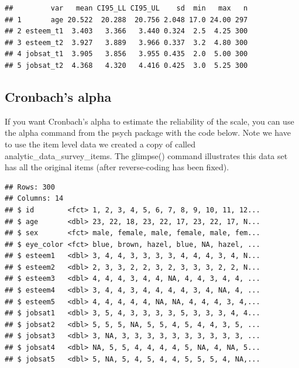 \documentclass[
]{krantz}
\makeatletter
\newenvironment{Shaded}{\begin{snugshade}}{\end{snugshade}}
\newcommand{\KeywordTok}[1]{\textcolor[rgb]{0.27,0.27,0.27}{\textbf{#1}}}
\newcommand{\NormalTok}[1]{#1}
\newcommand{\OperatorTok}[1]{\textcolor[rgb]{0.43,0.43,0.43}{\textbf{#1}}}
\newcommand{\StringTok}[1]{\textcolor[rgb]{0.5,0.5,0.5}{#1}}
\newenvironment{kframe}{%
\medskip{}
\setlength{\fboxsep}{.8em}
 \def\at@end@of@kframe{}%
 \ifinner\ifhmode%
  \def\at@end@of@kframe{\end{minipage}}%
  \begin{minipage}{\columnwidth}%
 \fi\fi%
 \def\FrameCommand##1{\hskip\@totalleftmargin \hskip-\fboxsep
 \colorbox{shadecolor}{##1}\hskip-\fboxsep
     \hskip-\linewidth \hskip-\@totalleftmargin \hskip\columnwidth}%
 \MakeFramed {\advance\hsize-\width
   \@totalleftmargin\z@ \linewidth\hsize
   \@setminipage}}%
 {\par\unskip\endMakeFramed%
 \at@end@of@kframe}
\renewenvironment{Shaded}{\begin{kframe}}{\end{kframe}}
\makeatother
\begin{document}
\begin{verbatim}
##         var   mean CI95_LL CI95_UL    sd  min   max   n
## 1       age 20.522  20.288  20.756 2.048 17.0 24.00 297
## 2 esteem_t1  3.403   3.366   3.440 0.324  2.5  4.25 300
## 3 esteem_t2  3.927   3.889   3.966 0.337  3.2  4.80 300
## 4 jobsat_t1  3.905   3.856   3.955 0.435  2.0  5.00 300
## 5 jobsat_t2  4.368   4.320   4.416 0.425  3.0  5.25 300
\end{verbatim}

\hypertarget{cronbachs-alpha}{%
\subsection{Cronbach's alpha}\label{cronbachs-alpha}}

If you want Cronbach's alpha to estimate the reliability of the scale, you can use the alpha command from the psych package with the code below. Note we have to use the item level data we created a copy of called analytic\_data\_survey\_items. The glimpse() command illustrates this data set has all the original items (after reverse-coding has been fixed).

\begin{Shaded}
\end{Shaded}

\begin{verbatim}
## Rows: 300
## Columns: 14
## $ id        <fct> 1, 2, 3, 4, 5, 6, 7, 8, 9, 10, 11, 12...
## $ age       <dbl> 23, 22, 18, 23, 22, 17, 23, 22, 17, N...
## $ sex       <fct> male, female, male, female, male, fem...
## $ eye_color <fct> blue, brown, hazel, blue, NA, hazel, ...
## $ esteem1   <dbl> 3, 4, 4, 3, 3, 3, 3, 4, 4, 4, 3, 4, N...
## $ esteem2   <dbl> 2, 3, 3, 2, 2, 3, 2, 3, 3, 3, 2, 2, N...
## $ esteem3   <dbl> 4, 4, 4, 3, 4, 4, NA, 4, 4, 3, 4, 4, ...
## $ esteem4   <dbl> 3, 4, 4, 3, 4, 4, 4, 4, 3, 4, NA, 4, ...
## $ esteem5   <dbl> 4, 4, 4, 4, 4, NA, NA, 4, 4, 4, 3, 4,...
## $ jobsat1   <dbl> 3, 5, 4, 3, 3, 3, 3, 5, 3, 3, 3, 4, 4...
## $ jobsat2   <dbl> 5, 5, 5, NA, 5, 5, 4, 5, 4, 4, 3, 5, ...
## $ jobsat3   <dbl> 3, NA, 3, 3, 3, 3, 3, 3, 3, 3, 3, 3, ...
## $ jobsat4   <dbl> NA, 5, 5, 4, 4, 4, 4, 5, NA, 4, NA, 5...
## $ jobsat5   <dbl> 5, NA, 5, 4, 5, 4, 4, 5, 5, 5, 4, NA,...
\end{verbatim}
\end{document}
